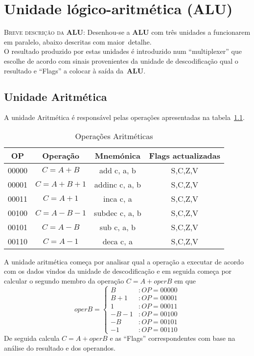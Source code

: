 \documentclass[11pt,a4paper,titlepage,onecolumn]{report}
\begin{document}
	\chapter{Unidade lógico-aritmética (ALU)}
	\textsc{Breve descrição da \textbf{ALU}: } Desenhou-se a \textbf{ALU} com três unidades a funcionarem em paralelo, abaixo descritas com maior~detalhe.\\
	O resultado produzido por estas unidades é introduzido num ``multiplexer'' que escolhe de acordo com sinais provenientes da unidade de descodificação qual o resultado e ``Flags'' a colocar à saída da~\textbf{ALU}.
	
	\section{Unidade Aritmética}
	A unidade Aritmética é responsável pelas operações apresentadas na tabela~\ref{tabela:arith}.
		
	\begin{table}[h]
		\centering
		\begin{tabular}{|c|c|c|c|}
			\hline
			OP    & Operação & Mnemónica & Flags actualizadas \\ \hline
			00000 & \mbox{$C=A+B$}    & add c, a, b    & S,C,Z,V   \\ \hline
			00001 & \mbox{$C=A+B+1$}  & addinc c, a, b & S,C,Z,V   \\ \hline
			00011 & \mbox{$C=A+1$}    & inca c, a      & S,C,Z,V   \\ \hline
			00100 & \mbox{$C=A-B-1$}  & subdec c, a, b & S,C,Z,V   \\ \hline
			00101 & \mbox{$C=A-B$}    & sub c, a, b    & S,C,Z,V   \\ \hline
			00110 & \mbox{$C=A-1$}    & deca c, a      & S,C,Z,V   \\ \hline
		\end{tabular}
		\caption{Operações Aritméticas}
		\label{tabela:arith}
	\end{table}
	
	A unidade aritmética começa por analisar qual a operação a executar de acordo com os dados vindos da unidade de descodificação e em seguida começa por calcular o segundo membro da operação \mbox{$C=A+operB$} em que 
	\[ operB=\left\{
		\begin{array}{lr}
		B & : OP=00000\\
		B+1 & : OP=00001\\
		1 & : OP=00011\\
		-B-1 & : OP=00100\\
		-B & : OP=00101\\
		-1 & : OP=00110
		\end{array}
		\right.\]
	De seguida calcula \mbox{$C=A+operB$} e as ``Flags'' correspondentes com base na análise do resultado e dos operandos.
	
\end{document}
